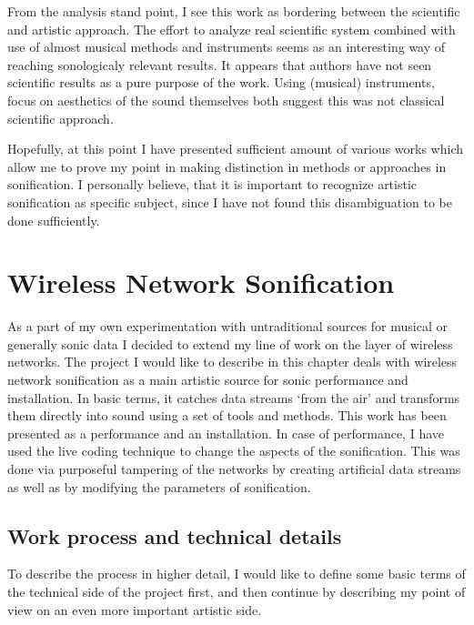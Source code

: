 \documentclass[12pt,a4paper,oneside]{report}
\begin{document}
From the analysis stand point, I see this work as bordering between the scientific and artistic approach. The effort to analyze real scientific system combined with use of almost musical methods and instruments seems as an interesting way of reaching sonologicaly relevant results. It appears that authors have not seen scientific results as a pure purpose of the work. Using (musical) instruments, focus on aesthetics of the sound themselves both suggest this was not classical scientific approach.

Hopefully, at this point I have presented sufficient amount of various works which allow me to prove my point in making distinction in methods or approaches in sonification. I personally believe, that it is important to recognize artistic sonification as specific subject, since I have not found this disambiguation to be done sufficiently.

\clearpage
\section{Wireless Network Sonification}
\label{sec:wifi}

As a part of my own experimentation with untraditional sources for musical or generally sonic data I decided to extend my line of work on the layer of wireless networks. The project I would like to describe in this chapter deals with wireless network sonification as a main artistic source for sonic performance and installation. In basic terms, it catches data streams `from the air' and transforms them directly into sound using a set of tools and methods. This work has been presented as a performance and an installation. In case of performance, I have used the live coding technique to change the aspects of the sonification. This was done via purposeful tampering of the networks by creating artificial data streams as well as by modifying the parameters of sonification.

\subsection{Work process and technical details}

To describe the process in higher detail, I would like to define some basic terms of the technical side of the project first, and then continue by describing my point of view on an even more important artistic side.
\end{document}
